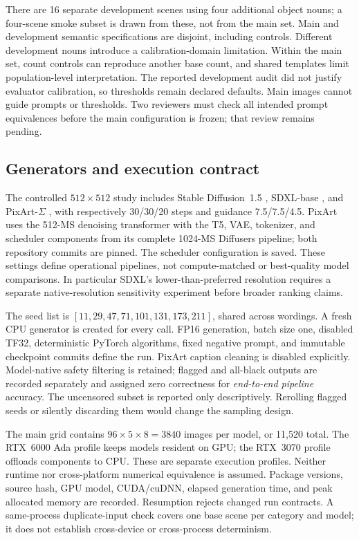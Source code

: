 \documentclass[10pt,letterpaper]{article}
\begin{document}
There are 16 separate development scenes using four additional object nouns; a four-scene smoke subset is drawn from these, not from the main set. Main and development semantic specifications are disjoint, including controls. Different development nouns introduce a calibration-domain limitation. Within the main set, count controls can reproduce another base count, and shared templates limit population-level interpretation. The reported development audit did not justify evaluator calibration, so thresholds remain declared defaults. Main images cannot guide prompts or thresholds. Two reviewers must check all intended prompt equivalences before the main configuration is frozen; that review remains pending.

\subsection{Generators and execution contract}
The controlled $512\times512$ study includes Stable Diffusion~1.5 \cite{ldm}, SDXL-base \cite{sdxl}, and PixArt-$\Sigma$ \cite{pixart}, with respectively 30/30/20 steps and guidance 7.5/7.5/4.5. PixArt uses the 512-MS denoising transformer with the T5, VAE, tokenizer, and scheduler components from its complete 1024-MS Diffusers pipeline; both repository commits are pinned. The scheduler configuration is saved. These settings define operational pipelines, not compute-matched or best-quality model comparisons. In particular SDXL's lower-than-preferred resolution requires a separate native-resolution sensitivity experiment before broader ranking claims.

The seed list is $[11,29,47,71,101,131,173,211]$, shared across wordings. A fresh CPU generator is created for every call. FP16 generation, batch size one, disabled TF32, deterministic PyTorch algorithms, fixed negative prompt, and immutable checkpoint commits define the run. PixArt caption cleaning is disabled explicitly. Model-native safety filtering is retained; flagged and all-black outputs are recorded separately and assigned zero correctness for \emph{end-to-end pipeline} accuracy. The uncensored subset is reported only descriptively. Rerolling flagged seeds or silently discarding them would change the sampling design.

The main grid contains $96\times5\times8=3840$ images per model, or 11,520 total. The RTX~6000 Ada profile keeps models resident on GPU; the RTX~3070 profile offloads components to CPU. These are separate execution profiles. Neither runtime nor cross-platform numerical equivalence is assumed. Package versions, source hash, GPU model, CUDA/cuDNN, elapsed generation time, and peak allocated memory are recorded. Resumption rejects changed run contracts. A same-process duplicate-input check covers one base scene per category and model; it does not establish cross-device or cross-process determinism.
\end{document}
